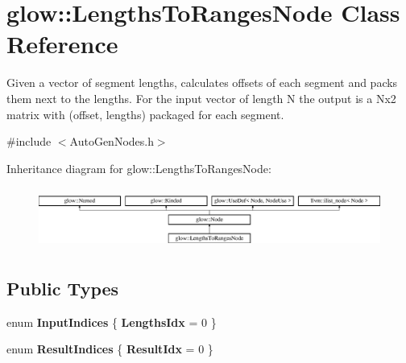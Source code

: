 \hypertarget{classglow_1_1_lengths_to_ranges_node}{}\section{glow\+:\+:Lengths\+To\+Ranges\+Node Class Reference}
\label{classglow_1_1_lengths_to_ranges_node}


Given a vector of segment lengths, calculates offsets of each segment and packs them next to the lengths. For the input vector of length N the output is a Nx2 matrix with (offset, lengths) packaged for each segment.  




{\ttfamily \#include $<$Auto\+Gen\+Nodes.\+h$>$}

Inheritance diagram for glow\+:\+:Lengths\+To\+Ranges\+Node\+:\begin{figure}[H]
\begin{center}
\leavevmode
\includegraphics[height=2.028986cm]{classglow_1_1_lengths_to_ranges_node}
\end{center}
\end{figure}
\subsection*{Public Types}
\begin{DoxyCompactItemize}
\item 
\mbox{\label{classglow_1_1_lengths_to_ranges_node_acfcebce8a6c2372da0d6568b8cc8d06c}} 
enum {\bfseries Input\+Indices} \{ {\bfseries Lengths\+Idx} = 0
 \}
\item 
\mbox{\label{classglow_1_1_lengths_to_ranges_node_a6e14ef4132384e6200665f0903b0ee9e}} 
enum {\bfseries Result\+Indices} \{ {\bfseries Result\+Idx} = 0
 \}
\end{DoxyCompactItemize}
